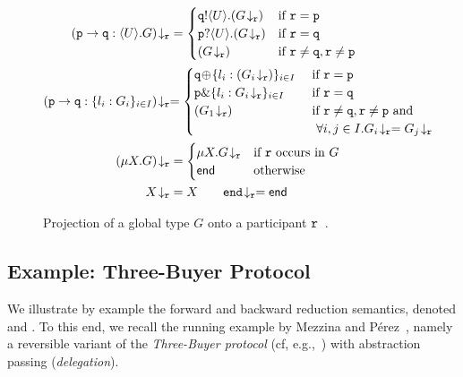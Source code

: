\documentclass[runningheads,plain]{llncs}
\begin{document}
\begin{figure}[!t]
{
\begin{align*}
\tproj{(\gtcom{p}{q}{U}{G})}{\gpart{r}} & = 
\begin{cases}
\ltout{q}{U}{(\tproj{G}{\gpart{r}})} & \text{if $\gpart{r} = \gpart{p}$} \\
\ltinp{p}{U}{(\tproj{G}{\gpart{r}})} & \text{if $\gpart{r} = \gpart{q}$} \\
(\tproj{G}{\gpart{r}}) &  \text{if $\gpart{r} \neq \gpart{q}, \gpart{r} \neq \gpart{p}$}
\end{cases}
\\
\tproj{(\gtcho{p}{q}{l_i}{G_i})}{\gpart{r}}  
& 
{= 
\begin{cases}
\ltsel{q}{\lbl_i}{(\tproj{G_i}{\gpart{r}})}{i}{I}  & \text{ if $\gpart{r} = \gpart{p}$} \\
\ltbra{p}{\lbl_i}{\tproj{G_i}{\gpart{r}}}{i}{I}  & \text{ if $\gpart{r} = \gpart{q}$} \\
(\tproj{{G_1}}{\gpart{r}}) &  \text{ if $\gpart{r} \neq \gpart{q}, \gpart{r} \neq \gpart{p}$ and} \\ 
& \text{~~$\forall i, j \in I. \tproj{{G_i}}{\gpart{r}} = \tproj{{G_j}}{\gpart{r}}$}
\end{cases}
}
\\
\tproj{(\mu X. G)}{\gpart{r}} &= 
\begin{cases}
\mu X. \tproj{G}{\gpart{r}} & \text{if $\gpart{r}$ occurs in $G$}
\\
\lend & \text{otherwise}
\end{cases}
\\
\tproj{X}{\gpart{r}} & = X
\qquad
\tproj{\gend}{\gpart{r}} = \lend
\end{align*}
}
\caption{Projection of a global type $G$ onto a participant $\mathtt{r}$~\cite{DBLP:conf/ppdp/MezzinaP17}.\label{f:proj}}
\end{figure}

\subsection{Example: Three-Buyer Protocol}\label{ss:exam}

We illustrate by example the 
forward and backward reduction semantics, denoted \fw and \bk.
To this end, we recall the running example by Mezzina and P\'{e}rez~\cite{DBLP:conf/ppdp/MezzinaP17}, namely
  a reversible variant of the \emph{Three-Buyer protocol}  (cf, e.g.,~\cite{CDYP2015})
with abstraction passing (\emph{delegation}). 
\end{document}
